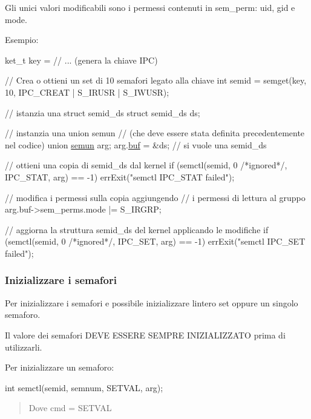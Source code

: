 Gli unici valori modificabili sono i permessi contenuti in {\ttfamily sem\+\_\+perm}\+: {\ttfamily uid}, {\ttfamily gid} e {\ttfamily mode}.

Esempio\+: 
\begin{DoxyCode}
ket\_t key = \textcolor{comment}{// ... (genera la chiave IPC)}

\textcolor{comment}{// Crea o ottieni un set di 10 semafori legato alla chiave}
\textcolor{keywordtype}{int} semid = semget(key, 10, IPC\_CREAT | S\_IRUSR | S\_IWUSR);

\textcolor{comment}{// istanzia una struct semid\_ds}
\textcolor{keyword}{struct }semid\_ds ds;

\textcolor{comment}{// instanzia una union semun}
\textcolor{comment}{// (che deve essere stata definita precedentemente nel codice)}
\textcolor{keyword}{union }\hyperlink{unionsemun}{semun} arg;
arg.\hyperlink{unionsemun_abe0ba6ad77214cee618027739e992503}{buf} = &ds;  \textcolor{comment}{// si vuole una semid\_ds}

\textcolor{comment}{// ottieni una copia di semid\_ds dal kernel}
\textcolor{keywordflow}{if} (semctl(semid, 0 \textcolor{comment}{/*ignored*/}, IPC\_STAT, arg) == -1)
    errExit(\textcolor{stringliteral}{"semctl IPC\_STAT failed"});

\textcolor{comment}{// modifica i permessi sulla copia aggiungendo}
\textcolor{comment}{// i permessi di lettura al gruppo}
arg.buf->sem\_perms.mode |= S\_IRGRP;

\textcolor{comment}{// aggiorna la struttura semid\_ds del kernel applicando le modifiche}
\textcolor{keywordflow}{if} (semctl(semid, 0 \textcolor{comment}{/*ignored*/}, IPC\_SET, arg) == -1)
    errExit(\textcolor{stringliteral}{"semctl IPC\_SET failed"});
\end{DoxyCode}


\subsubsection*{Inizializzare i semafori}

Per inizializzare i semafori e\textquotesingle{} possibile inizializzare l\textquotesingle{}intero set oppure un singolo semaforo.

Il valore dei semafori D\+E\+VE E\+S\+S\+E\+RE S\+E\+M\+P\+RE I\+N\+I\+Z\+I\+A\+L\+I\+Z\+Z\+A\+TO prima di utilizzarli.

Per inizializzare un semaforo\+: 
\begin{DoxyCode}
\textcolor{keywordtype}{int} semctl(semid, semnum, SETVAL, arg);
\end{DoxyCode}
 \begin{quote}
Dove {\ttfamily cmd} = {\ttfamily S\+E\+T\+V\+AL} \end{quote}


